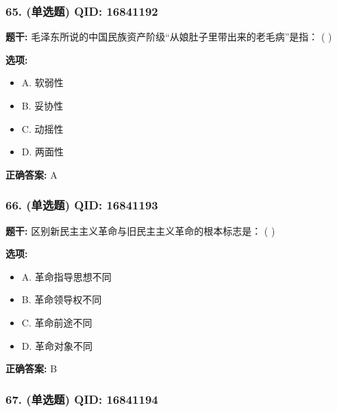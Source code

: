 \documentclass[12pt,UTF8]{ctexart}
\begin{document}
\subsubsection*{65. (单选题) \small QID: 16841192}

\textbf{题干:}
毛泽东所说的中国民族资产阶级“从娘肚子里带出来的老毛病”是指： ( )

\textbf{选项:}
\begin{itemize}[leftmargin=*]

  \item A. 软弱性

  \item B. 妥协性

  \item C. 动摇性

  \item D. 两面性

\end{itemize}

\textbf{正确答案:}
A

\vspace{0.3em}\hrulefill\vspace{0.7em}

\subsubsection*{66. (单选题) \small QID: 16841193}

\textbf{题干:}
区别新民主主义革命与旧民主主义革命的根本标志是： ( )

\textbf{选项:}
\begin{itemize}[leftmargin=*]

  \item A. 革命指导思想不同

  \item B. 革命领导权不同

  \item C. 革命前途不同

  \item D. 革命对象不同

\end{itemize}

\textbf{正确答案:}
B

\vspace{0.3em}\hrulefill\vspace{0.7em}

\subsubsection*{67. (单选题) \small QID: 16841194}
\end{document}
